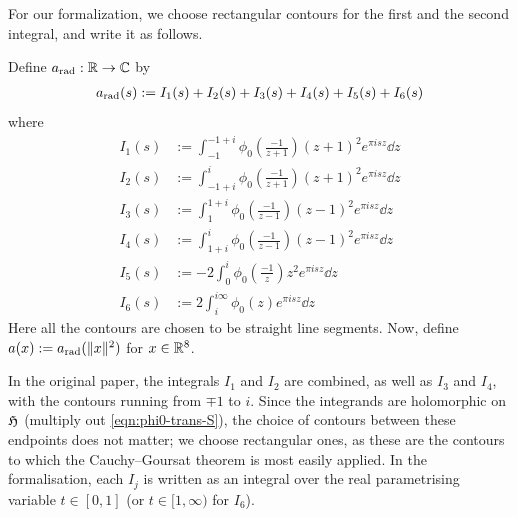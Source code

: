 For our formalization, we choose rectangular contours for the first and the second integral, and write it as follows.
\begin{definition}\label{def:a-definition}\leanok
{}
Define $a_{\mathrm{rad}} : \mathbb{R} \to \mathbb{C}$ by
\begin{align}\label{eqn:a-rad-definition}
    a_{\mathrm{rad}}(s) := I_1(s) + I_2(s) + I_3(s) + I_4(s) + I_5(s) + I_6(s)
\end{align}
where
\begin{align}
    I_1(s) &:= \int_{-1}^{-1 + i} \phi_0 \left(\frac{-1}{z+1}\right) (z + 1)^2 e^{\pi i s z} \dd z \label{eqn:a-I1} \\
    I_2(s) &:= \int_{-1 + i}^{i} \phi_0 \left(\frac{-1}{z+1}\right) (z + 1)^2 e^{\pi i s z} \dd z \label{eqn:a-I2} \\
    I_3(s) &:= \int_{1}^{1 + i} \phi_0 \left(\frac{-1}{z-1}\right) (z - 1)^2 e^{\pi i s z} \dd z \label{eqn:a-I3} \\
    I_4(s) &:= \int_{1 + i}^{i} \phi_0 \left(\frac{-1}{z-1}\right) (z - 1)^2 e^{\pi i s z} \dd z \label{eqn:a-I4} \\
    I_5(s) &:= -2 \int_{0}^{i} \phi_0 \left(\frac{-1}{z}\right) z^2 e^{\pi i s z} \dd z \label{eqn:a-I5} \\
    I_6(s) &:= 2 \int_{i}^{i\infty} \phi_0(z) e^{\pi i s z} \dd z \label{eqn:a-I6}
\end{align}
Here all the contours are chosen to be straight line segments.
Now, define $a(x) := a_{\mathrm{rad}}(\|x\|^2)$ for $x \in \mathbb{R}^8$.
\end{definition}
In the original paper, the integrals $I_1$ and $I_2$ are combined, as well as $I_3$ and $I_4$, with the contours running from $\mp 1$ to $i$.
Since the integrands are holomorphic on $\mathfrak{H}$ (multiply out \eqref{eqn:phi0-trans-S}), the choice of contours between these endpoints does not matter; we choose rectangular ones, as these are the contours to which the Cauchy--Goursat theorem is most easily applied.
In the formalisation, each $I_j$ is written as an integral over the real parametrising variable $t \in [0,1]$ (or $t \in [1, \infty)$ for $I_6$).

